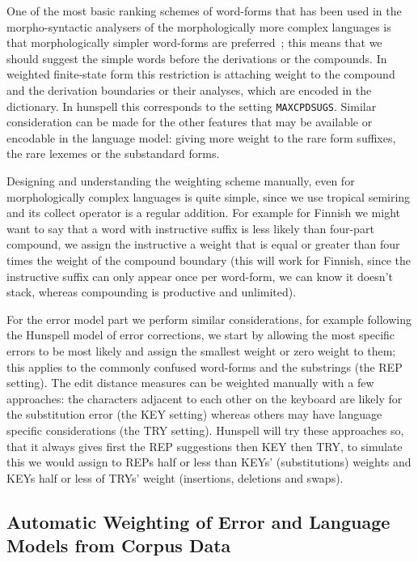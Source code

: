 \documentclass[a4paper,12pt]{article}
\begin{document}
One of the most basic ranking schemes of word-forms that has been used in the
morpho-syntactic analysers of the morphologically more complex languages is
that morphologically simpler word-forms are
preferred~\cite[]{karlsson1992swetwol}; this means that we should suggest the
simple words before the derivations or the compounds.  In weighted finite-state
form this restriction is attaching weight to the compound and the derivation
boundaries or their analyses, which are encoded in the dictionary. In hunspell
this corresponds to the setting \texttt{MAXCPDSUGS}. Similar consideration can
be made for the other features that may be available or encodable in the
language model: giving more weight to the rare form suffixes, the rare lexemes
or the substandard forms.

Designing and understanding the weighting scheme manually, even for
morphologically complex languages is quite simple, since we use tropical
semiring and its collect operator is a regular addition. For example for
Finnish we might want to say that a word with instructive suffix is less likely
than four-part compound, we assign the instructive a weight that is equal or
greater than four times the weight of the compound boundary (this will work for
Finnish, since the instructive suffix can only appear once per word-form, we
can know it doesn't stack, whereas compounding is productive and unlimited).

For the error model part we perform similar considerations, for example
following the Hunspell model of error corrections, we start by allowing the
most specific errors to be most likely and assign the smallest weight or zero
weight to them; this applies to the commonly confused word-forms and the
substrings (the REP setting). The edit distance measures can be weighted
manually with a few approaches: the characters adjacent to each other on the
keyboard are likely for the substitution error (the KEY setting) whereas others
may have language specific considerations (the TRY setting).  Hunspell will try
these approaches so, that it always gives first the REP suggestions then KEY
then TRY, to simulate this we would assign to REPs half or less than KEYs'
(substitutions) weights and KEYs half or less of TRYs' weight (insertions,
deletions and swaps).

\subsection{Automatic Weighting of Error and Language Models from Corpus Data}
\label{subsec:automatic-weighting}
\end{document}
